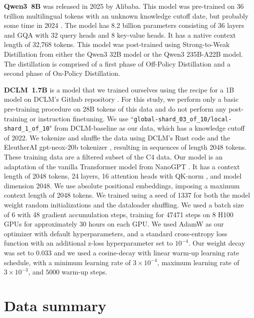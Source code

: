 \documentclass[aps,twocolumn,floats,prx]{revtex4}
\begin{document}
{\bf Qwen3~8B} was released in 2025 by Alibaba. This model was pre-trained on 36 trillion multilingual tokens with an unknown knowledge cutoff date, but probably some time in 2024 \cite{qwen3technicalreport}. The model has 8.2 billion parameters consisting of 36 layers and GQA with 32 query heads and 8 key-value heads.
It has a native context length of 32,768 tokens.
This model was post-trained using Strong-to-Weak Distillation from either the Qwen3 32B model or the Qwen3 235B-A22B model. The distillation is comprised of a first phase of Off-Policy Distillation and a second phase of On-Policy Distillation.

{\bf DCLM~1.7B} is a model that we trained ourselves using the recipe for a 1B model on DCLM's \cite{li2024datacomplm} Github repository \cite{Mlfoundations}. For this study, we perform only a basic pre-training procedure on 28B tokens of this data and do not perform any post-training or instruction finetuning. We use ``\texttt{global-shard\_03\_of\_10/local-shard\_1\_of\_10}" from DCLM-baseline as our data, which has a knowledge cutoff of 2022. We tokenize and shuffle the data using DCLM's Rust code and the EleutherAI gpt-neox-20b tokenizer \cite{black2022gptneox}, resulting in sequences of length 2048 tokens. These training data are a filtered subset of the C4 data. Our model is an adaptation of the vanilla Transformer \cite{vaswani2017attention} model from NanoGPT \cite{nanogpt}. It has a context length of 2048 tokens, 24 layers, 16 attention heads with QK-norm \cite{henry2020querykeynormalizationtransformers}, and model dimension 2048. We use absolute positional embeddings, imposing a maximum context length of 2048 tokens. We trained using a seed of 1337 for both the model weight random initializations and the dataloader shuffling. We used a batch size of 6 with 48 gradient accumulation steps, training for 47471 steps on 8 H100 GPUs for approximately 30 hours on each GPU. We used AdamW \cite{loshchilov2017decoupled} as our optimizer with default hyperparameters, and a standard cross-entropy loss function with an additional z-loss hyperparameter set to $10^{-4}$. Our weight decay was set to 0.033 and we used a cosine-decay with linear warm-up learning rate schedule, with a minimum learning rate of $3\times 10^{-4}$, maximum learning rate of $3\times 10^{-3}$, and $5000$ warm-up steps.

\section{Data summary}
\label{app:data}
\end{document}
